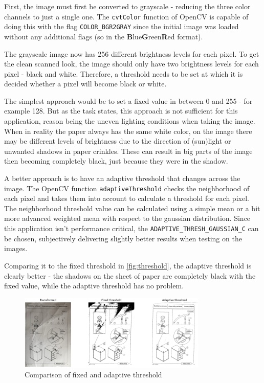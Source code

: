 First, the image must first be converted to grayscale - reducing the three color channels to just a single one. The \texttt{cvtColor} function of OpenCV is capable of doing this with the flag \texttt{COLOR\_BGR2GRAY} since the initial image was loaded without any additional flags (so in the \textbf{B}lue\textbf{G}reen\textbf{R}ed format).

The grayscale image now has 256 different brightness levels for each pixel. To get the clean scanned look, the image should only have two brightness levels for each pixel - black and white. Therefore, a threshold needs to be set at which it is decided whether a pixel will become black or white.

The simplest approach would be to set a fixed value in between 0 and 255 - for example 128. But as the task \cite{cv_lecture_ex} states, this approach is not sufficient for this application, reason being the uneven lighting conditions when taking the image. When in reality the paper always has the same white color, on the image there may be different levels of brightness due to the direction of (sun)light or unwanted shadows in paper crinkles. These can result in big parts of the image then becoming completely black, just because they were in the shadow.

A better approach is to have an adaptive threshold that changes across the image. The OpenCV function \texttt{adaptiveThreshold} checks the neighborhood of each pixel and takes them into account to calculate a threshold for each pixel. The neighborhood threshold value can be calculated using a simple mean or a bit more advanced weighted mean with respect to the gaussian distribution. Since this application isn't performance critical, the \texttt{ADAPTIVE\_THRESH\_GAUSSIAN\_C} can be chosen, subjectively delivering slightly better results when testing on the images.

Comparing it to the fixed threshold in \autoref{fig:threshold}, the adaptive threshold is clearly better - the shadows on the sheet of paper are completely black with the fixed value, while the adaptive threshold has no problem.

\begin{figure}[h]
    \includegraphics[width=0.8\textwidth]{figures/fixed_thr.jpg}
    \centering
    \caption{Comparison of fixed and adaptive threshold}
    \label{fig:threshold}
\end{figure}